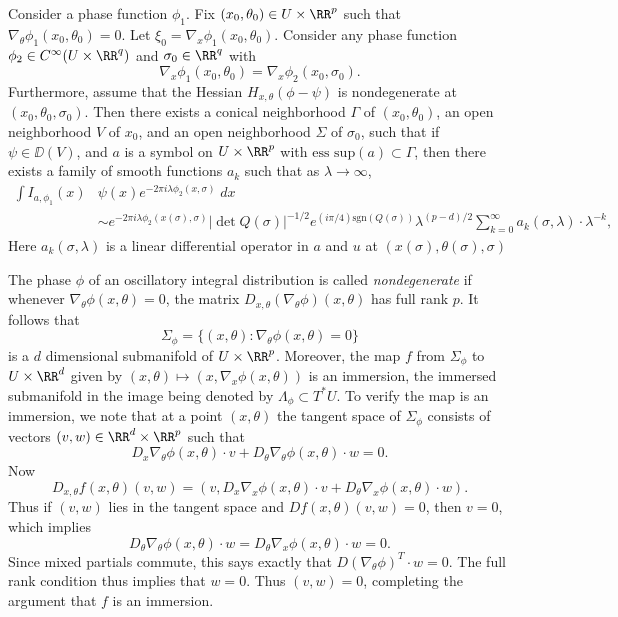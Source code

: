\begin{theorem}
    Consider a phase function $\phi_1$. Fix $(x_0,\theta_0) \in U \times \RR^p$ such that $\nabla_\theta \phi_1(x_0,\theta_0) = 0$. Let $\xi_0 = \nabla_x \phi_1(x_0,\theta_0)$. Consider any phase function $\phi_2 \in C^\infty(U \times \RR^q)$ and $\sigma_0 \in \RR^q$ with
    \[ \nabla_x \phi_1(x_0,\theta_0) = \nabla_x \phi_2(x_0,\sigma_0). \]
    Furthermore, assume that the Hessian $H_{x,\theta} (\phi - \psi)$ is nondegenerate at $(x_0,\theta_0,\sigma_0)$. Then there exists a conical neighborhood $\Gamma$ of $(x_0,\theta_0)$, an open neighborhood $V$ of $x_0$, and an open neighborhood $\Sigma$ of $\sigma_0$, such that if $\psi \in \DD(V)$, and $a$ is a symbol on $U \times \RR^p$ with $\text{ess sup}(a) \subset \Gamma$, then there exists a family of smooth functions $a_k$ such that as $\lambda \to \infty$,
    \begin{align*}
        \int I_{a,\phi_1}(x) & \psi(x) e^{-2 \pi i \lambda \phi_2(x,\sigma)}\; dx\\
        &\sim e^{-2 \pi i \lambda \phi_2(x(\sigma),\sigma)} |\det Q(\sigma)|^{-1/2} e^{(i \pi/4) \text{sgn}(Q(\sigma))} \lambda^{(p-d)/2} \sum_{k = 0}^\infty a_k(\sigma,\lambda) \cdot \lambda^{-k},
    \end{align*}
    Here $a_k(\sigma,\lambda)$ is a linear differential operator in $a$ and $u$ at $(x(\sigma), \theta(\sigma), \sigma)$
\end{theorem}

The phase $\phi$ of an oscillatory integral distribution is called \emph{nondegenerate} if whenever $\nabla_\theta \phi(x,\theta) = 0$, the matrix $D_{x,\theta}(\nabla_\theta \phi)(x,\theta)$ has full rank $p$. It follows that
%
\[ \Sigma_\phi = \{ (x,\theta): \nabla_\theta \phi(x,\theta) = 0 \} \]
%
is a $d$ dimensional submanifold of $U \times \RR^p$. Moreover, the map $f$ from $\Sigma_\phi$ to $U \times \RR^d$ given by $(x,\theta) \mapsto (x,\nabla_x \phi(x,\theta))$ is an immersion, the immersed submanifold in the image being denoted by $\Lambda_\phi \subset T^* U$. To verify the map is an immersion, we note that at a point $(x,\theta)$ the tangent space of $\Sigma_\phi$ consists of vectors $(v,w) \in \RR^d \times \RR^p$ such that
%
\[ D_x \nabla_\theta \phi(x,\theta) \cdot v + D_\theta \nabla_\theta \phi(x,\theta) \cdot w = 0. \]
%
Now
%
\[ D_{x,\theta}f(x,\theta)(v,w) = (v, D_x \nabla_x \phi(x,\theta) \cdot v + D_\theta \nabla_x \phi(x,\theta) \cdot w ). \]
%
Thus if $(v,w)$ lies in the tangent space and $Df(x,\theta)(v,w) = 0$, then $v = 0$, which implies
%
\[ D_\theta \nabla_\theta \phi(x,\theta) \cdot w = D_\theta \nabla_x \phi(x,\theta) \cdot w = 0. \]
%
Since mixed partials commute, this says exactly that $D(\nabla_\theta \phi)^T \cdot w = 0$. The full rank condition thus implies that $w = 0$. Thus $(v,w) = 0$, completing the argument that $f$ is an immersion.

